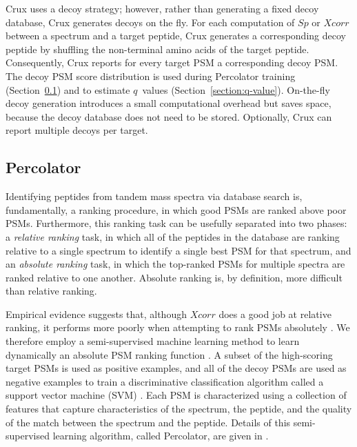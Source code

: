\documentclass{bioinfo}
\renewcommand{\cite}{\citep}
\begin{document}
Crux uses a decoy strategy; however, rather than generating a fixed
decoy database, Crux generates decoys on the fly.  For each
computation of $Sp$ or $Xcorr$ between a spectrum and a target
peptide, Crux generates a corresponding decoy peptide by shuffling the
non-terminal amino acids of the target peptide.  Consequently, Crux
reports for every target PSM a corresponding decoy PSM.  The decoy PSM
score distribution is used during Percolator training
(Section~\ref{section:percolator}) and to estimate $q$~values
(Section~\ref{section:q-value}).  On-the-fly decoy generation
introduces a small computational overhead but saves space, because the
decoy database does not need to be stored.  Optionally, Crux can
report multiple decoys per target.

\subsection{Percolator}
\label{section:percolator}

Identifying peptides from tandem mass spectra via database search is,
fundamentally, a ranking procedure, in which good PSMs are ranked
above poor PSMs.  Furthermore, this ranking task can be usefully
separated into two phases: a {\em relative ranking} task, in which all
of the peptides in the database are ranking relative to a single
spectrum to identify a single best PSM for that spectrum, and an {\em
absolute ranking} task, in which the top-ranked PSMs for multiple
spectra are ranked relative to one another.  Absolute ranking is, by
definition, more difficult than relative ranking.

Empirical evidence suggests that, although $Xcorr$ does a good job at
relative ranking, it performs more poorly when attempting to rank PSMs
absolutely \cite{keller:empirical, anderson:new}.  We therefore employ
a semi-supervised machine learning method to learn dynamically an
absolute PSM ranking function \cite{kall:semi-supervised}.  A subset
of the high-scoring target PSMs is used as positive examples, and all
of the decoy PSMs are used as negative examples to train a
discriminative classification algorithm called a support vector
machine (SVM) \cite{boser:training, noble:what}.  Each PSM is
characterized using a collection of features that capture
characteristics of the spectrum, the peptide, and the quality of the
match between the spectrum and the peptide.  Details of this
semi-supervised learning algorithm, called Percolator, are given in
\citet{kall:semi-supervised}.
\end{document}
